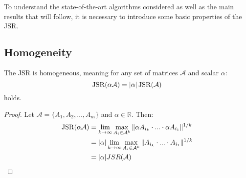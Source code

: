 To understand the state-of-the-art algorithms considered as well as the main results that will follow, it is necessary to introduce some basic properties of the JSR.

\subsection*{Homogeneity}
\begin{proposition}
    The JSR is homogeneous, meaning for any set of matrices $\mathcal{A}$ and scalar $\alpha$: 
    \begin{equation}
        \operatorname{JSR}(\alpha \mathcal{A}) = |\alpha| \operatorname{JSR}(\mathcal{A})
    \end{equation}
    holds.
\end{proposition}
\begin{proof}
    Let $\mathcal{A} = \{A_1, A_2, \dots, A_m\}$ and $\alpha \in \mathbb{R}$. Then:
    \begin{align*}
        \operatorname{JSR}(\alpha \mathcal{A}) & = \lim_{k \to \infty} \max_{A_i \in \mathcal{A}^k} \|\alpha A_{i_k} \cdot ... \cdot \alpha A_{i_1}\|^{1/k} \\
        & = |\alpha| \lim_{k \to \infty} \max_{A_i \in \mathcal{A}^k} \|A_{i_k} \cdot ... \cdot A_{i_1}\|^{1/k} \\
        & = |\alpha| JSR(\mathcal{A}) \\
    \end{align*}
\end{proof}

